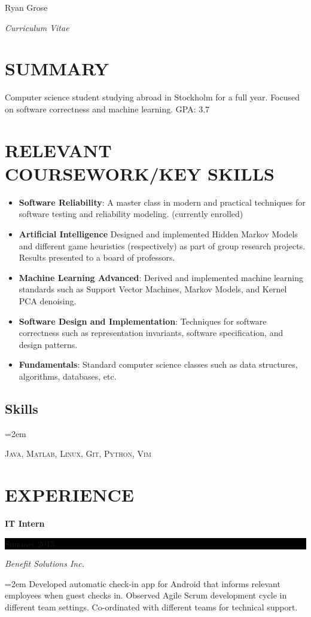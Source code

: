 \documentclass[paper=a4,fontsize=11pt]{scrartcl} %
\newlength{\spacebox}
\newcommand{\sepspace}{\vspace*{1em}}       %
\newcommand{\MyName}[1]{ %
        \Huge \usefont{OT1}{phv}{b}{n} #1 \hfill
        \par \normalsize \normalfont}
\newcommand{\MySlogan}[1]{ %
        \large \usefont{OT1}{phv}{m}{n} \textit{#1} \hfill
        \par \normalsize \normalfont}
\newcommand{\NewPart}[1]{\section*{\uppercase{#1}}}
\newcommand{\PersonalEntry}[2]{
        \noindent\hangindent=2em\hangafter=0 %
        \parbox{\spacebox}{        %
        \textit{#1}}               %
        \hspace{1.5em} #2 \par}    %
\newcommand{\SkillsEntry}[2]{      %
        \noindent\hangindent=2em\hangafter=0 %
        \parbox{\spacebox}{        %
        \textit{#1}}               %
        \hspace{1.5em} #2 \par}    %
\newcommand{\EducationEntry}[4]{
        \noindent \textbf{#1} \hfill      %
        \colorbox{Black}{%
            \parbox{6em}{%
            \hfill\color{White}#2}} \par  %
        \noindent \textit{#3} \par        %
        \noindent\hangindent=2em\hangafter=0 \small #4 %
        \normalsize \par}
\begin{document}

\MyName{Ryan Grose}
\MySlogan{ Curriculum Vitae}

\sepspace

\NewPart{Summary}
Computer science student studying abroad in Stockholm for a full year. Focused on software correctness and machine learning.
GPA: 3.7
\NewPart{Relevant Coursework/Key Skills}{}

\begin{itemize}
	\item \textbf{Software Reliability}: A master class in modern and practical techniques for software testing and reliability modeling. (currently enrolled)
	\item \textbf{Artificial Intelligence} Designed and implemented Hidden Markov Models and different game heuristics (respectively) as part of group research projects. Results presented to a board of professors.
	\item \textbf{Machine Learning Advanced}: Derived and implemented machine learning standards such as Support Vector Machines, Markov Models, and Kernel PCA denoising.
	\item \textbf{Software Design and Implementation}: Techniques for software correctness such as representation invariants, software specification, and design patterns.
	\item \textbf{Fundamentals}: Standard computer science classes such as data structures, algorithms, databases, etc.

\end{itemize}

\subsection*{Skills}

\SkillsEntry{\textbf{}}{\textsc{Java}, \textsc{Matlab}, \textsc{Linux}, \textsc{Git}, \textsc{Python}, \textsc{Vim}}


\NewPart{Experience}{}

\EducationEntry{IT Intern}{Summer 2015}{Benefit Solutions Inc.}{Developed automatic check-in app for Android that informs relevant employees when guest checks in. Observed Agile Scrum development cycle in different team settings. Co-ordinated with different teams for technical support. }
\sepspace
\end{document}

